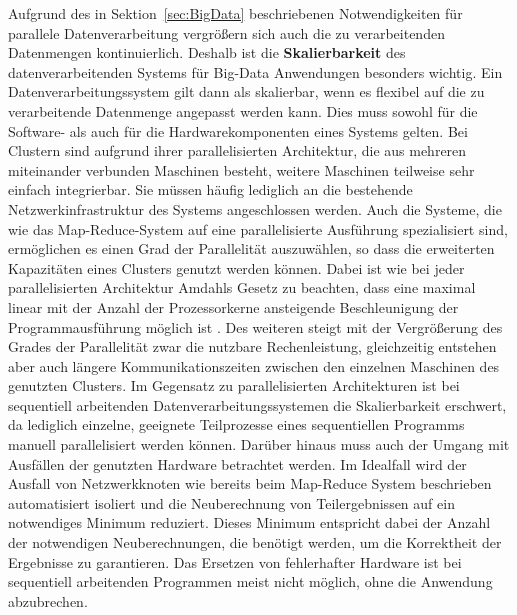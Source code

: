 Aufgrund des in Sektion~\ref{sec:BigData} beschriebenen Notwendigkeiten für parallele Datenverarbeitung vergrößern sich auch die zu verarbeitenden Datenmengen kontinuierlich. Deshalb ist die \textbf{Skalierbarkeit} des datenverarbeitenden Systems für Big-Data Anwendungen besonders wichtig. Ein Datenverarbeitungssystem gilt dann als skalierbar, wenn es flexibel auf die zu verarbeitende Datenmenge angepasst werden kann. Dies muss sowohl für die Software- als auch für die Hardwarekomponenten eines Systems gelten. Bei Clustern sind aufgrund ihrer parallelisierten Architektur, die aus mehreren miteinander verbunden Maschinen besteht, weitere Maschinen teilweise sehr einfach integrierbar. Sie müssen häufig lediglich an die bestehende Netzwerkinfrastruktur des Systems angeschlossen werden. Auch die Systeme, die wie das Map-Reduce-System auf eine parallelisierte Ausführung spezialisiert sind, ermöglichen es einen Grad der Parallelität auszuwählen, so dass die erweiterten Kapazitäten eines Clusters genutzt werden können. Dabei ist wie bei jeder parallelisierten Architektur Amdahls Gesetz zu beachten, dass eine maximal linear mit der Anzahl der Prozessorkerne ansteigende Beschleunigung der Programmausführung möglich ist \cite{Amdahl1967}. Des weiteren steigt mit der Vergrößerung des Grades der Parallelität zwar die nutzbare Rechenleistung, gleichzeitig entstehen aber auch längere Kommunikationszeiten zwischen den einzelnen Maschinen des genutzten Clusters.
Im Gegensatz zu parallelisierten Architekturen ist bei sequentiell arbeitenden Datenverarbeitungssystemen die Skalierbarkeit erschwert, da lediglich einzelne, geeignete Teilprozesse eines sequentiellen Programms manuell parallelisiert werden können. Darüber hinaus muss auch der Umgang mit Ausfällen der genutzten Hardware betrachtet werden. Im Idealfall wird der Ausfall von Netzwerkknoten wie bereits beim Map-Reduce System beschrieben automatisiert isoliert und die Neuberechnung von Teilergebnissen auf ein notwendiges Minimum reduziert. Dieses Minimum entspricht dabei der Anzahl der notwendigen Neuberechnungen, die benötigt werden, um die Korrektheit der Ergebnisse zu garantieren. Das Ersetzen von fehlerhafter Hardware ist bei sequentiell arbeitenden Programmen meist nicht möglich, ohne die Anwendung abzubrechen. 

